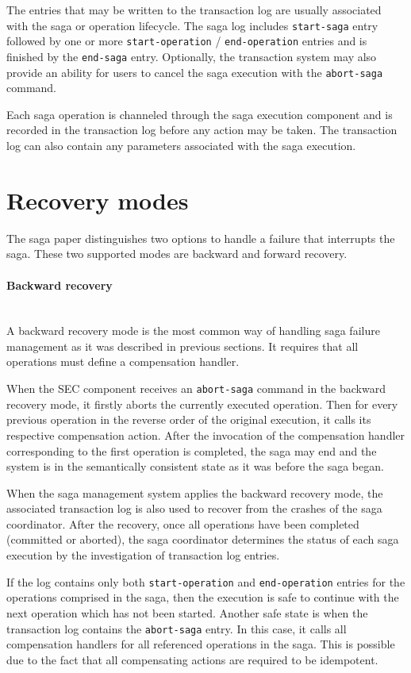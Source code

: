 \documentclass[oneside,
  digital, %
  table,   %
  lof,     %
  lot,     %
]{fithesis3}
\newcommand{\newlinepar}[1]{\paragraph{#1}\needspace{3\baselineskip}\mbox{}\\}
\begin{document}
The entries that may be written to the transaction log are usually associated with the saga or operation lifecycle. The saga log includes \texttt{start-saga} entry followed by one or more \texttt{start-operation} / \texttt{end-operation} entries and is finished by the \texttt{end-saga} entry. Optionally, the transaction system may also provide an ability for users to cancel the saga execution with the \texttt{abort-saga} command. 

Each saga operation is channeled through the saga execution component and is recorded in the transaction log before any action may be taken. The transaction log can also contain any parameters associated with the saga execution.

\section{Recovery modes}
\label{sec:recovery-modes}

The saga paper \cite{sagas_publ} distinguishes two options to handle a failure that interrupts the saga. These two supported modes are backward and forward recovery.

\newlinepar{Backward recovery}

A backward recovery mode is the most common way of handling saga failure management as it was described in previous sections. It requires that all operations must define a compensation handler.

When the SEC component receives an \texttt{abort-saga} command in the backward recovery mode, it firstly aborts the currently executed operation. Then for every previous operation in the reverse order of the original execution, it calls its respective compensation action. After the invocation of the compensation handler corresponding to the first operation is completed, the saga may end and the system is in the semantically consistent state as it was before the saga began.

When the saga management system applies the backward recovery mode, the associated transaction log is also used to recover from the crashes of the saga coordinator. After the recovery, once all operations have been completed (committed or aborted), the saga coordinator determines the status of each saga execution by the investigation of transaction log entries. 

If the log contains only both \texttt{start-operation} and \texttt{end-operation} entries for the operations comprised in the saga, then the execution is safe to continue with the next operation which has not been started. Another safe state is when the transaction log contains the \texttt{abort-saga} entry. In this case, it calls all compensation handlers for all referenced operations in the saga. This is possible due to the fact that all compensating actions are required to be idempotent.
\end{document}

